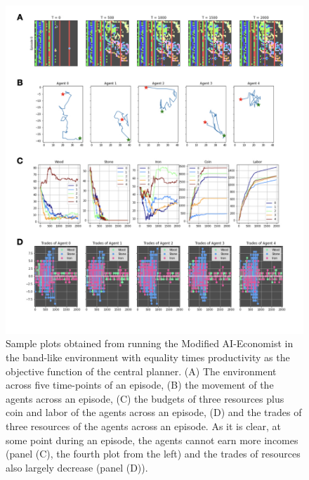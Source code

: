 \documentclass{article}
\begin{document}
\begin{figure}
	\centering
	\includegraphics[width=0.7\linewidth]{"A_Multi-agent_Reinforcement_Learning_Study_of_Emergence_of_Social_Classes_out_of_Arbitrary_Governance_The_Role_of_Environment_Slides_2/A_Multi-agent_Reinforcement_Learning_Study_of_Emergence_of_Social_Classes_out_of_Arbitrary_Governance_The_Role_of_Environment_Slides_2.001"}
	\caption{Sample plots obtained from running the Modified AI-Economist in the band-like environment with equality times productivity as the objective function of the central planner. (A) The environment across five time-points of an episode, (B) the movement of the agents across an episode, (C) the budgets of three resources plus coin and labor of the agents across an episode, (D) and the trades of three resources of the agents across an episode. As it is clear, at some point during an episode, the agents cannot earn more incomes (panel (C), the fourth plot from the left) and the trades of resources also largely decrease (panel (D)).}
	\label{Figure2}
\end{figure}
\end{document}
